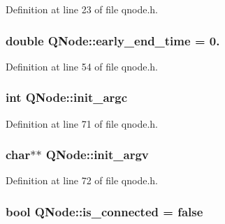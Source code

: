 Definition at line 23 of file qnode.\+h.

\subsubsection[{\texorpdfstring{early\+\_\+end\+\_\+time}{early_end_time}}]{\setlength{\rightskip}{0pt plus 5cm}double Q\+Node\+::early\+\_\+end\+\_\+time = 0.}\hypertarget{class_q_node_a6e6b7e12d0d9bbc230cc9dc42a2bd087}{}\label{class_q_node_a6e6b7e12d0d9bbc230cc9dc42a2bd087}


Definition at line 54 of file qnode.\+h.

\subsubsection[{\texorpdfstring{init\+\_\+argc}{init_argc}}]{\setlength{\rightskip}{0pt plus 5cm}int Q\+Node\+::init\+\_\+argc\hspace{0.3cm}{\ttfamily [protected]}}\hypertarget{class_q_node_aa0c7569195d8b9a6e568e98097f11d52}{}\label{class_q_node_aa0c7569195d8b9a6e568e98097f11d52}


Definition at line 71 of file qnode.\+h.

\subsubsection[{\texorpdfstring{init\+\_\+argv}{init_argv}}]{\setlength{\rightskip}{0pt plus 5cm}char$\ast$$\ast$ Q\+Node\+::init\+\_\+argv\hspace{0.3cm}{\ttfamily [protected]}}\hypertarget{class_q_node_a92c2972e3dd2a5de95d0edf8c75e1e5f}{}\label{class_q_node_a92c2972e3dd2a5de95d0edf8c75e1e5f}


Definition at line 72 of file qnode.\+h.

\subsubsection[{\texorpdfstring{is\+\_\+connected}{is_connected}}]{\setlength{\rightskip}{0pt plus 5cm}bool Q\+Node\+::is\+\_\+connected = false}\hypertarget{class_q_node_a98b08e7704b00df8648f8c08dffe950c}{}\label{class_q_node_a98b08e7704b00df8648f8c08dffe950c}


